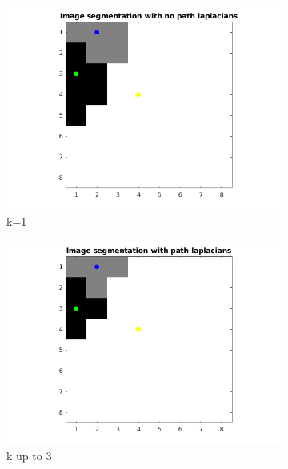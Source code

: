 \documentclass[10pt,a4paper]{article}
\begin{document}
\begin{figure}[!h]
	\centering
	\begin{subfigure}[b]{0.45\textwidth}
		\includegraphics[width=\textwidth]{segmentation-images/8by8longrange1-s4.png}
		\caption{k=1}
	\end{subfigure}
	\begin{subfigure}[b]{0.45\textwidth}
		\includegraphics[width=\textwidth]{segmentation-images/8by8longrange3-s2.png}
		\caption{k up to 3}
	\end{subfigure} \\
    \begin{subfigure}[b]{0.45\textwidth}

\end{subfigure}
\end{figure}
\end{document}

